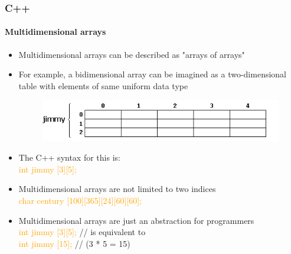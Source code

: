 \documentclass[hyperref={pdfpagelabels=true}]{beamer}
\begin{document}
\begin{frame}[shrink]
\frametitle{C++}
\framesubtitle{Multidimensional arrays}
\begin{itemize}[<+->]
\item Multidimensional arrays can be described as "arrays of arrays"
\item For example, a bidimensional array can be imagined as a two-dimensional table with elements of same uniform data type
\begin{figure}[!tbp]
\centering
\includegraphics[scale = 0.5]{figs/Selection_022.png}
\end{figure}
\item The C++ syntax for this is: \\ \textcolor{orange}{int jimmy [3][5];}
\item Multidimensional arrays are not limited to two indices \\ \textcolor{orange}{char century [100][365][24][60][60];}
\item Multidimensional arrays are just an abstraction for programmers\\
\textcolor{orange}{int jimmy [3][5];}   // is equivalent to \\
\textcolor{orange}{int jimmy [15]; }    // (3 * 5 = 15)  
\end{itemize}
\end{frame}
\end{document}
